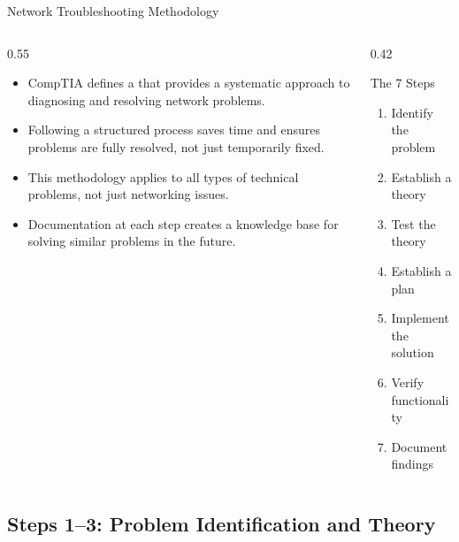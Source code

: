 \documentclass[aspectratio=169]{beamer}  %
\begin{document}

\begin{frame}{Network Troubleshooting Methodology}
    \begin{columns}[T]
        \begin{column}{0.55\textwidth}
            \begin{itemize}
                \item CompTIA defines a  that provides a systematic approach to diagnosing and resolving network problems.
                \item Following a structured process saves time and ensures problems are fully resolved, not just temporarily fixed.
                \item This methodology applies to all types of technical problems, not just networking issues.
                \item Documentation at each step creates a knowledge base for solving similar problems in the future.
            \end{itemize}
        \end{column}
        \begin{column}{0.42\textwidth}
            \begin{block}{The 7 Steps}
                \begin{enumerate}
                    \item Identify the problem
                    \item Establish a theory
                    \item Test the theory
                    \item Establish a plan
                    \item Implement the solution
                    \item Verify functionality
                    \item Document findings
                \end{enumerate}
            \end{block}
        \end{column}
    \end{columns}
\end{frame}

\subsection{Steps 1--3: Problem Identification and Theory}
\end{document}
